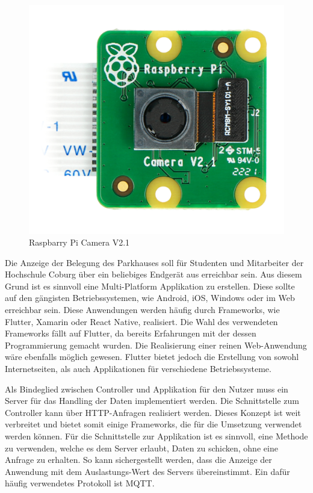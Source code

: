 \begin{figure}[h]
	\myImagePos{}
	\includegraphics[width=0.4\myImageWidth]{Bilder/piCam.jpg}
	\caption[Raspberry Pi Camera V2.1]{Raspbarry Pi Camera V2.1\cite{PiCamPIC}}
	\label{fig:PiCAM}
\end{figure}

Die Anzeige der Belegung des Parkhauses soll für Studenten und Mitarbeiter der Hochschule Coburg über ein beliebiges Endgerät aus erreichbar sein.
Aus diesem Grund ist es sinnvoll eine Multi-Platform Applikation zu erstellen. 
Diese sollte auf den gängisten Betriebssystemen, wie Android, iOS, Windows oder im Web erreichbar sein.
Diese Anwendungen werden häufig durch Frameworks, wie Flutter, Xamarin oder React Native, realisiert.
Die Wahl des verwendeten Frameworks fällt auf Flutter, da bereits Erfahrungen mit der dessen Programmierung gemacht wurden.
Die Realisierung einer reinen Web-Anwendung wäre ebenfalls möglich gewesen. 
Flutter bietet jedoch die Erstellung von sowohl Internetseiten, als auch Applikationen für verschiedene Betriebssysteme.

Als Bindeglied zwischen Controller und Applikation für den Nutzer muss ein Server für das Handling der Daten implementiert werden.
Die Schnittstelle zum Controller kann über HTTP-Anfragen realisiert werden.
Dieses Konzept ist weit verbreitet und bietet somit einige Frameworks, die für die Umsetzung verwendet werden können.
Für die Schnittstelle zur Applikation ist es sinnvoll, eine Methode zu verwenden, welche es dem Server erlaubt, Daten zu schicken, ohne eine Anfrage zu erhalten.
So kann sichergestellt werden, dass die Anzeige der Anwendung mit dem Auslastungs-Wert des Servers übereinstimmt. 
Ein dafür häufig verwendetes Protokoll ist MQTT.

